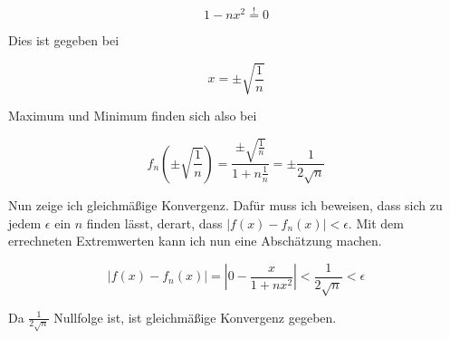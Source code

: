 \documentclass[a4paper,german,12pt,smallheadings]{scrartcl}
\begin{document}
\begin{equation*}
  1-nx^2 \overset{!}{=} 0
\end{equation*}

Dies ist gegeben bei

\begin{equation}
  x = \pm \sqrt{\frac{1}{n}}
\end{equation}

Maximum und Minimum finden sich also bei

\begin{equation*}
  f_n\left(\pm\sqrt{\frac{1}{n}}\right) = \frac{\pm\sqrt{\frac{1}{n}}}{1+n\frac{1}{n}} = \pm\frac{1}{2\sqrt{n}}
\end{equation*}

Nun zeige ich gleichmäßige Konvergenz. Dafür muss ich beweisen, dass sich zu
jedem $\epsilon$ ein $n$ finden lässt, derart, dass $\left| f(x) - f_n(x)
\right| < \epsilon$. Mit dem errechneten Extremwerten kann ich nun eine
Abschätzung machen.

\begin{equation*}
  \left| f(x) - f_n(x) \right| = \left|0-\frac{x}{1+nx^2}\right| < \frac{1}{2\sqrt{n}} < \epsilon
\end{equation*}

Da $\frac{1}{2\sqrt{n}}$ Nullfolge ist, ist gleichmäßige Konvergenz gegeben.
\end{document}
